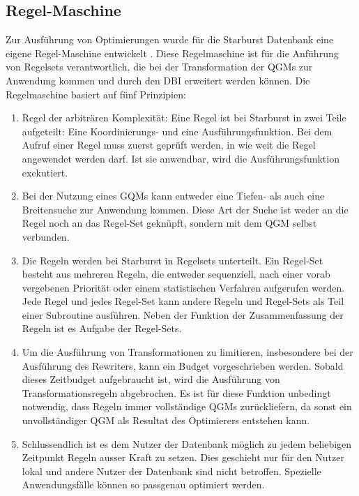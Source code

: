 \subsection{Regel-Maschine}

Zur Ausführung von Optimierungen wurde für die Starburst Datenbank eine eigene Regel-Maschine entwickelt \cite{lohman1988Starbust}. Diese Regelmaschine ist für die Anführung von Regelsets verantwortlich, die bei der Transformation der QGMs zur Anwendung kommen und durch den \ac{DBI}  erweitert werden können. Die Regelmaschine basiert auf fünf Prinzipien:

\begin{enumerate}
\item Regel der arbiträren Komplexität: Eine Regel ist bei Starburst in zwei Teile aufgeteilt: Eine Koordinierungs- und eine Ausführungsfunktion. Bei dem Aufruf einer Regel muss zuerst geprüft werden, in wie weit die Regel angewendet werden darf. Ist sie anwendbar, wird die Ausführungsfunktion exekutiert.

\item Bei der Nutzung eines GQMs kann entweder eine Tiefen- als auch eine Breitensuche zur Anwendung kommen. Diese Art der Suche ist weder an die Regel noch an das Regel-Set geknüpft, sondern mit dem QGM selbst verbunden.


\item Die Regeln werden bei Starburst in Regelsets unterteilt. Ein Regel-Set besteht aus mehreren Regeln, die entweder sequenziell, nach einer vorab vergebenen Priorität oder einem statistischen Verfahren aufgerufen werden. Jede Regel und jedes Regel-Set kann andere Regeln und Regel-Sets als Teil einer Subroutine ausführen. Neben der Funktion der Zusammenfassung der Regeln ist es Aufgabe der Regel-Sets.

\item Um die Ausführung von Transformationen zu limitieren, insbesondere bei der Ausführung des Rewriters, kann ein Budget vorgeschrieben werden. Sobald dieses Zeitbudget aufgebraucht ist, wird die Ausführung von Transformationsregeln abgebrochen. Es ist für diese Funktion unbedingt notwendig, dass Regeln immer vollständige QGMs zurückliefern, da sonst ein unvollständiger QGM als Resultat des Optimierers entstehen kann.

\item Schlussendlich ist es dem Nutzer der Datenbank möglich zu jedem beliebigen Zeitpunkt Regeln ausser Kraft zu setzen. Dies geschieht nur für den Nutzer lokal und andere Nutzer der Datenbank sind nicht betroffen. Spezielle Anwendungsfälle können so passgenau optimiert werden.
\end{enumerate}

